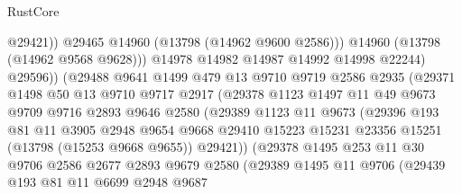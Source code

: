 \begin{lexlean}{RustCore}
\begin{coremodule}
                                @29421))
                            @29465
                            @14960
                            (@13798 (@14962 @9600 @2586)))
                          @14960
                          (@13798 (@14962 @9568 @9628)))
                        @14978
                        @14982
                        @14987
                        @14992
                        @14998
                        @22244)
                      @29596))
                  (@29488
                    @9641
                    @1499
                    @479
                    @13
                    @9710
                    @9719
                    @2586
                    @2935
                    (@29371
                      @1498
                      @50
                      @13
                      @9710
                      @9717
                      @2917
                      (@29378
                        @1123
                        @1497
                        @11
                        @49
                        @9673
                        @9709
                        @9716
                        @2893
                        @9646
                        @2580
                        (@29389
                          @1123
                          @11
                          @9673
                          (@29396
                            @193
                            @81
                            @11
                            @3905
                            @2948
                            @9654
                            @9668
                            @29410
                            @15223
                            @15231
                            @23356
                            @15251
                            (@13798 (@15253 @9668 @9655))
                            @29421))
                        (@29378
                          @1495
                          @253
                          @11
                          @30
                          @9706
                          @2586
                          @2677
                          @2893
                          @9679
                          @2580
                          (@29389
                            @1495
                            @11
                            @9706
                            (@29439
                              @193
                              @81
                              @11
                              @6699
                              @2948
                              @9687

\end{coremodule}
\end{lexlean}
